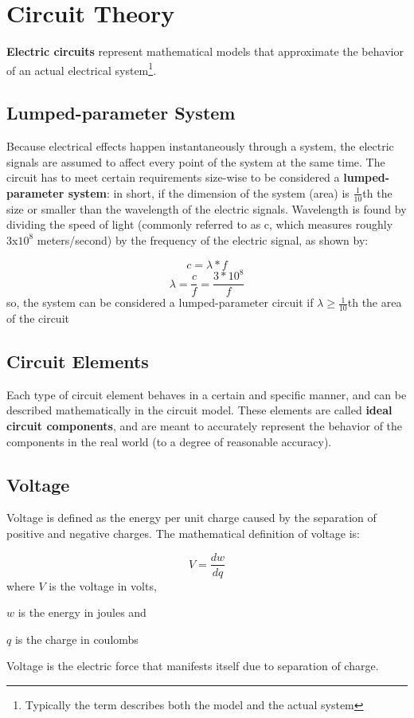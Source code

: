 \documentclass[12pt, letterpaper]{memoir}
\begin{document}
\chapter{Circuit Theory}
\textbf{Electric circuits} represent mathematical models that approximate the behavior of an actual electrical system\footnote{Typically the term describes both the model and the actual system}. 
\section{Lumped-parameter System}
Because electrical effects happen instantaneously through a system, the electric signals are assumed to affect every point of the system at the same time. The circuit has to meet certain requirements size-wise to be considered a \textbf{lumped-parameter system}: in short, if the dimension of the system (area) is $\frac{1}{10}$th the size or smaller than the wavelength of the electric signals. Wavelength is found by dividing the speed of light (commonly referred to as c, which measures roughly 3x$10^8$ meters/second) by the frequency of the electric signal, as shown by:
\begin{eqlisting}[H] \label{wvlen_lp}
	\centering
	\begin{equation}
		c = \lambda * f
	\end{equation}
	\begin{equation}
		\lambda = \frac{c}{f} = \frac{3*10^8}{f}
	\end{equation}
	\small \justify so, the system can be considered a lumped-parameter circuit if $\lambda \geq \frac{1}{10}$th the area of the circuit 
\end{eqlisting}
\normalsize
\section{Circuit Elements}
Each type of circuit element behaves in a certain and specific manner, and can be described mathematically in the circuit model. These elements are called \textbf{ideal circuit components}, and are meant to accurately represent the behavior of the components in the real world (to a degree of reasonable accuracy).

\section{Voltage}
Voltage is defined as the energy per unit charge caused by the separation of positive and negative charges. The mathematical definition of voltage is:
\begin{eqlisting} \label{voltageeq}
	\centering
	\begin{equation}
		V = \frac{dw}{dq}
	\end{equation}
	\small where $V$ is the voltage in volts,
			
			$w$ is the energy in joules and
			
			$q$ is the charge in coulombs
\end{eqlisting}
\normalsize
Voltage is the electric force that manifests itself due to separation of charge.
\end{document}
